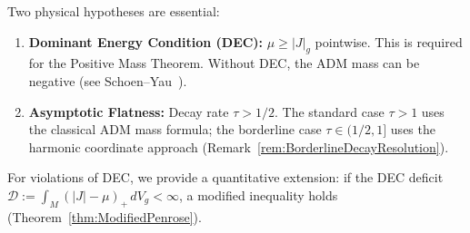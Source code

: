 Two physical hypotheses are essential:
\begin{enumerate}
    \item[(P1)] \textbf{Dominant Energy Condition (DEC):} $\mu \ge |J|_g$ pointwise. This is required for the Positive Mass Theorem. Without DEC, the ADM mass can be negative (see Schoen--Yau~\cite{schoenyau1981}).
    \item[(P2)] \textbf{Asymptotic Flatness:} Decay rate $\tau > 1/2$. The standard case $\tau > 1$ uses the classical ADM mass formula; the borderline case $\tau \in (1/2, 1]$ uses the harmonic coordinate approach (Remark~\ref{rem:BorderlineDecayResolution}).
\end{enumerate}
For violations of DEC, we provide a quantitative extension: if the DEC deficit $\mathcal{D} := \int_M (|J| - \mu)_+ \, dV_g < \infty$, a modified inequality holds (Theorem~\ref{thm:ModifiedPenrose}).

